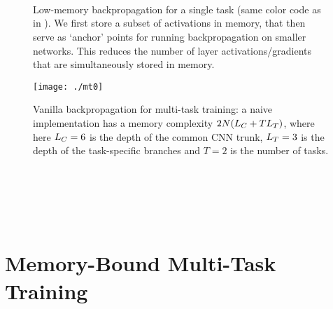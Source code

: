 \documentclass[10pt,twocolumn,letterpaper]{article}
\begin{document}
\begin{figure}
	\begin{center}
		\\
		\\
		\\
	\end{center}
	\caption{Low-memory backpropagation for a single task (same color code as in ). We first store a subset of activations in memory, that then serve as  `anchor' points for running backpropagation on smaller networks. This reduces the number of layer activations/gradients that are simultaneously  stored in memory. \label{fig:memorysingle}}
\end{figure}

\begin{figure}
	\texttt{[image: ./mt0]}
	\caption{Vanilla backpropagation for multi-task training: a naive implementation has a memory complexity  $2 N (L_{C}   +  T L_{T} )$, where here $L_{C}=6$ is the depth of the common CNN trunk, $L_{T}=3$ is the depth of the task-specific branches and $T=2$ is the number of tasks.\label{fig:vanillamtask}}
\end{figure}

\newcommand{\trm}{ .4cm }
\begin{figure}
	\\
	\\
	\\
	\\
\end{figure}

\section{Memory-Bound Multi-Task Training}
\end{document}
